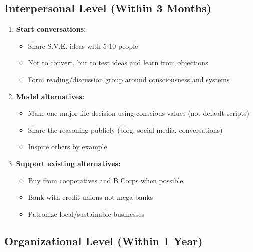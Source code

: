 \documentclass[11pt,a4paper]{article}
\theoremstyle{definition}
\theoremstyle{remark}
\begin{document}
\subsection{Interpersonal Level (Within 3 Months)}

\begin{enumerate}
    \item \textbf{Start conversations:}
    \begin{itemize}
        \item Share S.V.E. ideas with 5-10 people
        \item Not to convert, but to test ideas and learn from objections
        \item Form reading/discussion group around consciousness and systems
    \end{itemize}
    
    \item \textbf{Model alternatives:}
    \begin{itemize}
        \item Make one major life decision using conscious values (not default scripts)
        \item Share the reasoning publicly (blog, social media, conversations)
        \item Inspire others by example
    \end{itemize}
    
    \item \textbf{Support existing alternatives:}
    \begin{itemize}
        \item Buy from cooperatives and B Corps when possible
        \item Bank with credit unions not mega-banks
        \item Patronize local/sustainable businesses
    \end{itemize}
\end{enumerate}

\subsection{Organizational Level (Within 1 Year)}
\end{document}
